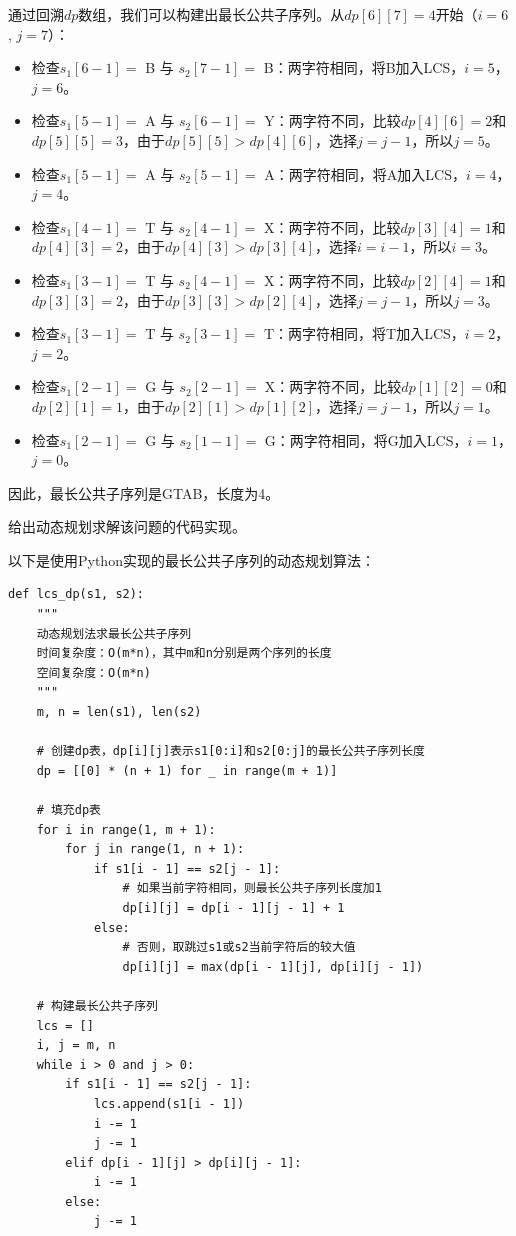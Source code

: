 \documentclass[12pt,twoside]{article}
\begin{document}
\begin{problems}
通过回溯$dp$数组，我们可以构建出最长公共子序列。从$dp[6][7] = 4$开始（$i=6$, $j=7$）：
\begin{itemize}
    \item 检查$s_1[6-1] = $ B 与 $s_2[7-1] = $ B：两字符相同，将B加入LCS，$i=5$，$j=6$。
    \item 检查$s_1[5-1] = $ A 与 $s_2[6-1] = $ Y：两字符不同，比较$dp[4][6]=2$和$dp[5][5]=3$，由于$dp[5][5] > dp[4][6]$，选择$j=j-1$，所以$j=5$。
    \item 检查$s_1[5-1] = $ A 与 $s_2[5-1] = $ A：两字符相同，将A加入LCS，$i=4$，$j=4$。
    \item 检查$s_1[4-1] = $ T 与 $s_2[4-1] = $ X：两字符不同，比较$dp[3][4]=1$和$dp[4][3]=2$，由于$dp[4][3] > dp[3][4]$，选择$i=i-1$，所以$i=3$。
    \item 检查$s_1[3-1] = $ T 与 $s_2[4-1] = $ X：两字符不同，比较$dp[2][4]=1$和$dp[3][3]=2$，由于$dp[3][3] > dp[2][4]$，选择$j=j-1$，所以$j=3$。
    \item 检查$s_1[3-1] = $ T 与 $s_2[3-1] = $ T：两字符相同，将T加入LCS，$i=2$，$j=2$。
    \item 检查$s_1[2-1] = $ G 与 $s_2[2-1] = $ X：两字符不同，比较$dp[1][2]=0$和$dp[2][1]=1$，由于$dp[2][1] > dp[1][2]$，选择$j=j-1$，所以$j=1$。
    \item 检查$s_1[2-1] = $ G 与 $s_2[1-1] = $ G：两字符相同，将G加入LCS，$i=1$，$j=0$。
\end{itemize}

因此，最长公共子序列是GTAB，长度为4。

\ppart 给出动态规划求解该问题的代码实现。

以下是使用Python实现的最长公共子序列的动态规划算法：

\begin{verbatim}
def lcs_dp(s1, s2):
    """
    动态规划法求最长公共子序列
    时间复杂度：O(m*n)，其中m和n分别是两个序列的长度
    空间复杂度：O(m*n)
    """
    m, n = len(s1), len(s2)
    
    # 创建dp表，dp[i][j]表示s1[0:i]和s2[0:j]的最长公共子序列长度
    dp = [[0] * (n + 1) for _ in range(m + 1)]
    
    # 填充dp表
    for i in range(1, m + 1):
        for j in range(1, n + 1):
            if s1[i - 1] == s2[j - 1]:
                # 如果当前字符相同，则最长公共子序列长度加1
                dp[i][j] = dp[i - 1][j - 1] + 1
            else:
                # 否则，取跳过s1或s2当前字符后的较大值
                dp[i][j] = max(dp[i - 1][j], dp[i][j - 1])
    
    # 构建最长公共子序列
    lcs = []
    i, j = m, n
    while i > 0 and j > 0:
        if s1[i - 1] == s2[j - 1]:
            lcs.append(s1[i - 1])
            i -= 1
            j -= 1
        elif dp[i - 1][j] > dp[i][j - 1]:
            i -= 1
        else:
            j -= 1
    

\end{verbatim}
\end{problems}
\end{document}
